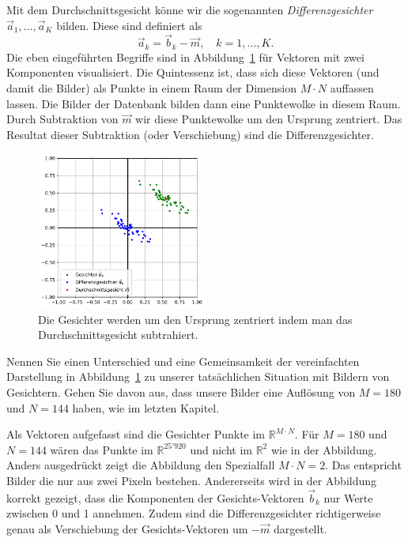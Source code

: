 Mit dem Durchschnittsgesicht könne wir die sogenannten \textit{Differenzgesichter} $\vec a_1,\ldots,\vec a_K$ bilden.
Diese sind definiert als
\begin{equation*}
	\vec a_k=\vec b_k-\vec m,\quad k=1,\ldots,K.
\end{equation*}
Die eben eingeführten Begriffe sind in Abbildung~\ref{fig:meandiff} für Vektoren mit zwei Komponenten visualisiert.
Die Quintessenz ist, dass sich diese Vektoren (und damit die Bilder) als Punkte in einem Raum der Dimension $M\cdot N$ auffassen lassen.
Die Bilder der Datenbank bilden dann eine \glqq{}Punktewolke\grqq{} in diesem Raum.
Durch Subtraktion von $\vec m$ wir diese Punktewolke um den Ursprung zentriert.
Das Resultat dieser Subtraktion (oder Verschiebung) sind die Differenzgesichter.
\begin{figure}[ht]
	\centering
	\includegraphics[width=0.5\textwidth]{images/facespace/meandiff}
	\caption{Die Gesichter werden um den Ursprung zentriert indem man das Durchschnittsgesicht subtrahiert.}
	\label{fig:meandiff}
\end{figure}
\begin{aufgabe} \label{aufg:hmmc}
	Nennen Sie einen Unterschied und eine Gemeinsamkeit der vereinfachten Darstellung in Abbildung~\ref{fig:meandiff} zu unserer tatsächlichen Situation mit Bildern von Gesichtern.
	Gehen Sie davon aus, dass unsere Bilder eine Auflösung von $M=180$ und $N=144$ haben, wie im letzten Kapitel.
\end{aufgabe}
\begin{losung}
	Als Vektoren aufgefasst sind die Gesichter Punkte im $\mathbb R^{M\cdot N}$.
	Für $M=180$ und $N=144$ wären das Punkte im $\mathbb R^{25'920}$ und nicht im $\mathbb R^2$ wie in der Abbildung.
	Anders ausgedrückt zeigt die Abbildung den Spezialfall $M\cdot N=2$.
	Das entspricht Bilder die nur aus zwei Pixeln bestehen.
	Andererseits wird in der Abbildung korrekt gezeigt, dass die Komponenten der Gesichts-Vektoren $\vec b_k$ nur Werte zwischen 0 und 1 annehmen.
	Zudem sind die Differenzgesichter richtigerweise genau als Verschiebung der Gesichts-Vektoren um $-\vec m$ dargestellt.
\end{losung}

